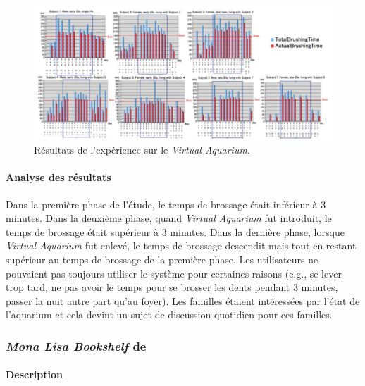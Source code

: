 \documentclass[10pt,a5paper,twoside]{article}
\begin{document}
\begin{figure}
\centering
\includegraphics[]{images/virtualaquarium-screenshot5.png}
\caption{Résultats de l'expérience sur le \emph{Virtual
Aquarium}.}\label{fig:virtualaquarium5}
\end{figure}

\paragraph{Analyse des résultats}\label{analyse-des-ruxe9sultats}

Dans la première phase de l'étude, le temps de brossage était inférieur
à 3 minutes. Dans la deuxième phase, quand \emph{Virtual Aquarium} fut
introduit, le temps de brossage était supérieur à 3 minutes. Dans la
dernière phase, lorsque \emph{Virtual Aquarium} fut enlevé, le temps de
brossage descendit mais tout en restant supérieur au temps de brossage
de la première phase. Les utilisateurs ne pouvaient pas toujours
utiliser le système pour certaines raisons (e.g., se lever trop tard, ne
pas avoir le temps pour se brosser les dents pendant 3 minutes, passer
la nuit autre part qu'au foyer). Les familles étaient intéressées par
l'état de l'aquarium et cela devint un sujet de discussion quotidien
pour ces familles.

\subsubsection{\emph{Mona Lisa Bookshelf} de
\citet{nakajima2008reflecting}}\label{mona-lisa-bookshelf-de-nakajima2008reflecting}

\paragraph{Description}\label{description-1}
\end{document}
